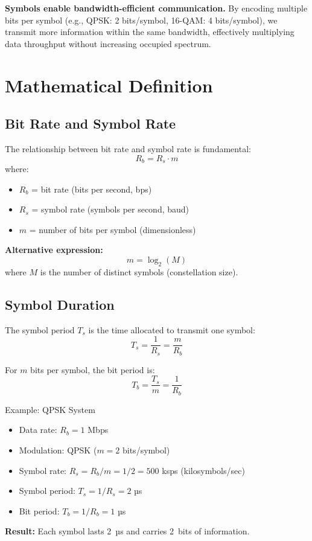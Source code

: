 \begin{keyconcept}
\textbf{Symbols enable bandwidth-efficient communication.} By encoding multiple bits per symbol (e.g., QPSK: 2 bits/symbol, 16-QAM: 4 bits/symbol), we transmit more information within the same bandwidth, effectively multiplying data throughput without increasing occupied spectrum.
\end{keyconcept}

\section{Mathematical Definition}

\subsection{Bit Rate and Symbol Rate}

The relationship between bit rate and symbol rate is fundamental:
\begin{equation}
R_b = R_s \cdot m
\end{equation}
where:
\begin{itemize}
\item $R_b$ = bit rate (bits per second, bps)
\item $R_s$ = symbol rate (symbols per second, baud)
\item $m$ = number of bits per symbol (dimensionless)
\end{itemize}

\textbf{Alternative expression:}
\begin{equation}
m = \log_2(M)
\end{equation}
where $M$ is the number of distinct symbols (constellation size).

\subsection{Symbol Duration}

The symbol period $T_s$ is the time allocated to transmit one symbol:
\begin{equation}
T_s = \frac{1}{R_s} = \frac{m}{R_b}
\end{equation}

For $m$ bits per symbol, the bit period is:
\begin{equation}
T_b = \frac{T_s}{m} = \frac{1}{R_b}
\end{equation}

\begin{calloutbox}{Example: QPSK System}
\begin{itemize}
\item Data rate: $R_b = 1$ Mbps
\item Modulation: QPSK ($m = 2$ bits/symbol)
\item Symbol rate: $R_s = R_b / m = 1/2 = 500$ ksps (kilosymbols/sec)
\item Symbol period: $T_s = 1/R_s = 2$ µs
\item Bit period: $T_b = 1/R_b = 1$ µs
\end{itemize}

\textbf{Result:} Each symbol lasts 2~µs and carries 2~bits of information.
\end{calloutbox}

